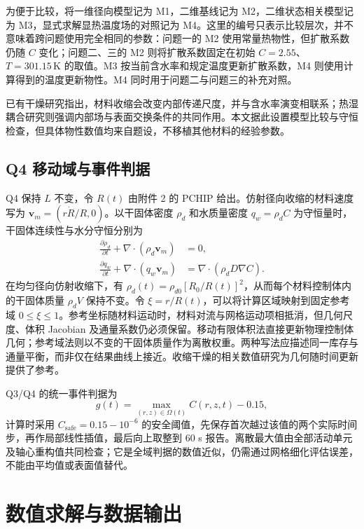 \documentclass[withoutpreface,bwprint]{cumcmthesis}
\begin{document}
为便于比较，将一维径向模型记为 M1，二维基线记为 M2，二维状态相关模型记为 M3，显式求解显热温度场的对照记为 M4。这里的编号只表示比较层次，并不意味着跨问题使用完全相同的参数：问题一的 M2 使用常量热物性，但扩散系数仍随 \(C\) 变化；问题二、三的 M2 则将扩散系数固定在初始 \(C=2.55\)、\(T=301.15\,\mathrm K\) 的取值。M3 按当前含水率和规定温度更新扩散系数，M4 则使用计算得到的温度更新物性。M4 同时用于问题二与问题三的补充对照。

已有干燥研究指出，材料收缩会改变内部传递尺度，并与含水率演变相联系\cite{p04,p05}；热湿耦合研究则强调内部场与表面交换条件的共同作用\cite{p06,p07}。本文据此设置模型比较与守恒检查，但具体物性数值均来自题设，不移植其他材料的经验参数。

\subsection{Q4 移动域与事件判据}

Q4 保持 \(L\) 不变，令 \(R(t)\) 由附件 2 的 PCHIP 给出。仿射径向收缩的材料速度写为 \(\boldsymbol v_m=(r\dot R/R,0)\)。以干固体密度 \(\rho_d\) 和水质量密度 \(q_w=\rho_d C\) 为守恒量时，干固体连续性与水分守恒分别为
\begin{align}
\frac{\partial\rho_d}{\partial t}+\nabla\cdot(\rho_d\boldsymbol v_m)&=0,\\
\frac{\partial q_w}{\partial t}+\nabla\cdot(q_w\boldsymbol v_m)&=\nabla\cdot(\rho_dD\nabla C).
\end{align}
在均匀径向仿射收缩下，有 \(\rho_d(t)=\rho_{d0}[R_0/R(t)]^2\)，从而每个材料控制体内的干固体质量 \(\rho_d V\) 保持不变。令 \(\xi=r/R(t)\)，可以将计算区域映射到固定参考域 \(0\le\xi\le1\)。参考坐标随材料运动时，材料对流与网格运动项相抵消，但几何尺度、体积 Jacobian 及通量系数仍必须保留。移动有限体积法直接更新物理控制体几何；参考域法则以不变的干固体质量作为离散权重。两种写法应描述同一库存与通量平衡，而非仅在结果曲线上接近。收缩干燥的相关数值研究为几何随时间更新提供了参考\cite{p09}。

Q3/Q4 的统一事件判据为
\begin{equation}
g(t)=\max_{(r,z)\in\Omega(t)}C(r,z,t)-0.15,
\label{eq:event}
\end{equation}
计算时采用 \(C_{\mathrm{safe}}=0.15-10^{-6}\) 的安全阈值，先保存首次越过该值的两个实际时间步，再作局部线性插值，最后向上取整到 60 s 报告。离散最大值由全部活动单元及轴心重构值共同检查；它是全域判据的数值近似，仍需通过网格细化评估误差，不能由平均值或表面值替代。

\section{数值求解与数据输出}
\end{document}
